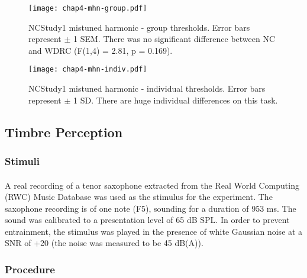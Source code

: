 \begin{figure}[htp]
\begin{center}
\texttt{[image: chap4-mhn-group.pdf]} \\
\caption[NCStudy1 mistuned harmonic - group thresholds]{NCStudy1 mistuned harmonic - group thresholds.  Error bars represent $\pm$ 1 SEM.  There was no significant difference between NC and WDRC (F(1,4) = 2.81, p = 0.169).}
\label{ch4-mhn-group}
\end{center}
\end{figure}

\begin{figure}[htp]
\begin{center}
\texttt{[image: chap4-mhn-indiv.pdf]} \\
\caption[NCStudy1 mistuned harmonic - individual thresholds]{NCStudy1 mistuned harmonic - individual thresholds.  Error bars represent $\pm$ 1 SD.  There are huge individual differences on this task.}
\label{ch4-mhn-indiv}
\end{center}
\end{figure}


\subsection{Timbre Perception}
\subsubsection{Stimuli}
\paragraph{}A real recording of a tenor saxophone extracted from the Real World Computing (RWC) Music Database \cite{Goto2003} was used as the stimulus for the experiment.  The saxophone recording is of one note (F5), sounding for a duration of 953 ms.  The sound was calibrated to a presentation level of 65 dB SPL.  In order to prevent entrainment, the stimulus was played in the presence of white Gaussian noise at a SNR of +20 (the noise was measured to be 45 dB(A)).
\subsubsection{Procedure}
